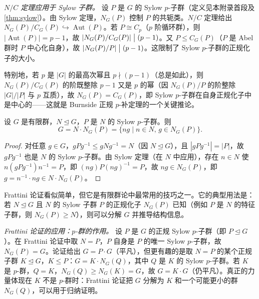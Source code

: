 \medskip
\noindent\emph{$N/C$ 定理应用于 Sylow 子群。}
设 $P$ 是 $G$ 的 Sylow $p$-子群（定义见本附录首段及\cref{thm:sylow}）。由 Sylow 定理，$N_G(P)$ 控制 $P$ 的共轭类。$N/C$ 定理给出 $N_G(P)/C_G(P)\hookrightarrow\operatorname{Aut}(P)$。若 $P\cong C_p$（$p$ 阶循环群），则 $|\operatorname{Aut}(P)|=p-1$，故 $|N_G(P)/C_G(P)|\bigm|(p-1)$。又 $P\leqslant C_G(P)$（$P$ 是 Abel 群时 $P$ 中心化自身），故 $|N_G(P)/P|\bigm|(p-1)$。这限制了 Sylow $p$-子群的正规化子的大小。

特别地，若 $p$ 是 $|G|$ 的最高次幂且 $p\nmid(p-1)$（总是如此），则 $N_G(P)/C_G(P)$ 的阶既整除 $p-1$ 又是 $p$ 的幂（因 $N_G(P)/P$ 的阶整除 $|G|/|P|$ 与 $p$ 互质），故 $N_G(P)=C_G(P)$，即 Sylow $p$-子群在自身正规化子中是中心的——这就是 Burnside 正规 $p$-补定理的一个关键推论。
\par\medskip

\begin{theorem}[Frattini 论证]
\label{thm:frattini-argument}
设 $G$ 是有限群，$N\mathrel{\trianglelefteq} G$，$P$ 是 $N$ 的 Sylow $p$-子群。则
\[
G=N\cdot N_G(P)=\{ng\mid n\in N,\,g\in N_G(P)\}.
\]
\end{theorem}

\begin{proof}
对任意 $g\in G$，$gPg^{-1}\leqslant gNg^{-1}=N$（因 $N\mathrel{\trianglelefteq} G$），且 $|gPg^{-1}|=|P|$，故 $gPg^{-1}$ 也是 $N$ 的 Sylow $p$-子群。由 Sylow 定理（在 $N$ 中应用），存在 $n\in N$ 使 $n(gPg^{-1})n^{-1}=P$，即 $(ng)P(ng)^{-1}=P$，故 $ng\in N_G(P)$，即 $g=n^{-1}\cdot ng\in N\cdot N_G(P)$。
\end{proof}

Frattini 论证看似简单，但它是有限群论中最常用的技巧之一。它的典型用法是：若 $N\mathrel{\trianglelefteq} G$ 且 $N$ 的 Sylow 子群 $P$ 的正规化子 $N_G(P)$ 已知（例如 $P$ 是 $N$ 的特征子群，则 $N_G(P)\geqslant N$），则可以分解 $G$ 并推导结构信息。

\medskip
\noindent\emph{Frattini 论证的应用：$p$-群的作用。}
设 $P$ 是 $G$ 的正规 Sylow $p$-子群（即 $P\mathrel{\trianglelefteq} G$）。在 Frattini 论证中取 $N=P$，$P$ 自身是 $P$ 的唯一 Sylow $p$-子群，故 $N_G(P)=G$。论证给出 $G=P\cdot G$（平凡），但更有趣的是取 $N=P$ 的某个正规子群 $K\mathrel{\trianglelefteq} G$，$K\leqslant P$：$G=K\cdot N_G(Q)$，其中 $Q$ 是 $K$ 的 Sylow $p$-子群。若 $K$ 是 $p$-群，$Q=K$，$N_G(Q)\geqslant N_G(K)=G$，故 $G=K\cdot G$（仍平凡）。真正的力量体现在 $K$ 不是 $p$-群时：Frattini 论证把 $G$ 分解为 $K$ 和一个可能更小的群 $N_G(Q)$，可以用于归纳证明。
\par\medskip

